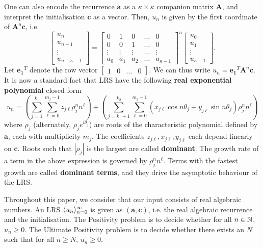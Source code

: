 One can also encode the recurrence $\mathbf{a}$ as a $\kappa \times \kappa$ companion matrix $\mathbf{A}$, and interpret the initialisation $\mathbf{c}$ as a vector. Then, $u_n$ is given by the first coordinate of $\mathbf{A}^n\mathbf{c}$, i.e.
\begin{equation}
\label{eq:companion}
\begin{bmatrix}
u_n \\
u_{n+1} \\
\vdots \\
u_{n+\kappa-1}
\end{bmatrix} 
= 
\begin{bmatrix}
0 & 1 & 0 & \dots & 0 \\
0 & 0 & 1 & \dots & 0 \\
\vdots & \vdots & \vdots & \dots & \vdots \\
a_0 & a_1 & a_2 & \dots & a_{\kappa-1}
\end{bmatrix}^n
\begin{bmatrix}
u_0 \\
u_{1} \\
\vdots \\
u_{\kappa-1}
\end{bmatrix}.
\end{equation}
Let $\mathbf{e_1}^T$ denote the row vector $\begin{bmatrix}1 & 0 & \dots & 0\end{bmatrix}$. We can thus write $u_n = \mathbf{e_1}^T\mathbf{A}^n\mathbf{c}$. It is now a standard fact that LRS have the following \textbf{real exponential polynomial} closed form\begin{equation}
\label{eq:realexppoly}
u_n = \left(\sum_{j=1}^{k_1}\sum_{\ell = 0}^{m_j-1} z_{j\ell}\rho_j^n n^\ell\right) + \left(\sum_{j=k_1 + 1}^{k_2} \sum_{\ell = 0}^{m_j-1} (x_{j\ell} \cos n\theta_j + y_{j\ell}\sin n\theta_j)\rho_j^n n^\ell\right)
\end{equation}
where $\rho_j$ (alternately, $\rho_j e^{i\theta_j}$) are roots of the characteristic polynomial defined by $\mathbf{a}$, each with multiplicity $m_j$. The coefficients $z_{j\ell}, x_{j\ell}, y_{j\ell}$ each depend linearly on $\mathbf{c}$. Roots such that $|\rho_j|$ is the largest are called \textbf{dominant}. The growth rate of a term in the above expression is governed by $\rho_j^n n^\ell$. Terms with the fastest growth are called \textbf{dominant terms}, and they drive the asymptotic behaviour of the LRS.

Throughout this paper, we consider that our input consists of real algebraic numbers.
An LRS $\langle u_n\rangle_{n=0}^\infty$ is given as $(\mathbf{a}, \mathbf{c})$, i.e. the real algebraic recurrence and the initialisation. The Positivity problem is to decide whether for all $n \in \mathbb{N}$, $u_n \ge 0$.
The Ultimate Positivity problem is to decide whether there exists an $N$ such that for all $n \ge N$, $u_n \ge 0$.


